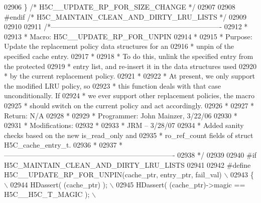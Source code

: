\begin{DoxyCode}
02906 \textcolor{preprocessor}{\} }\textcolor{comment}{/* H5C\_\_UPDATE\_RP\_FOR\_SIZE\_CHANGE */}\textcolor{preprocessor}{}
02907 
02908 \textcolor{preprocessor}{#endif }\textcolor{comment}{/* H5C\_MAINTAIN\_CLEAN\_AND\_DIRTY\_LRU\_LISTS */}\textcolor{preprocessor}{}
02909 
02910 
02911 \textcolor{comment}{/*-------------------------------------------------------------------------}
02912 \textcolor{comment}{ *}
02913 \textcolor{comment}{ * Macro:   H5C\_\_UPDATE\_RP\_FOR\_UNPIN}
02914 \textcolor{comment}{ *}
02915 \textcolor{comment}{ * Purpose:     Update the replacement policy data structures for an}
02916 \textcolor{comment}{ *      unpin of the specified cache entry.}
02917 \textcolor{comment}{ *}
02918 \textcolor{comment}{ *      To do this, unlink the specified entry from the protected}
02919 \textcolor{comment}{ *      entry list, and re-insert it in the data structures used}
02920 \textcolor{comment}{ *      by the current replacement policy.}
02921 \textcolor{comment}{ *}
02922 \textcolor{comment}{ *      At present, we only support the modified LRU policy, so}
02923 \textcolor{comment}{ *      this function deals with that case unconditionally.  If}
02924 \textcolor{comment}{ *      we ever support other replacement policies, the macro}
02925 \textcolor{comment}{ *      should switch on the current policy and act accordingly.}
02926 \textcolor{comment}{ *}
02927 \textcolor{comment}{ * Return:      N/A}
02928 \textcolor{comment}{ *}
02929 \textcolor{comment}{ * Programmer:  John Mainzer, 3/22/06}
02930 \textcolor{comment}{ *}
02931 \textcolor{comment}{ * Modifications:}
02932 \textcolor{comment}{ *}
02933 \textcolor{comment}{ *      JRM -- 3/28/07}
02934 \textcolor{comment}{ *      Added sanity checks based on the new is\_read\_only and}
02935 \textcolor{comment}{ *      ro\_ref\_count fields of struct H5C\_cache\_entry\_t.}
02936 \textcolor{comment}{ *}
02937 \textcolor{comment}{ *-------------------------------------------------------------------------}
02938 \textcolor{comment}{ */}
02939 
02940 \textcolor{preprocessor}{#if H5C\_MAINTAIN\_CLEAN\_AND\_DIRTY\_LRU\_LISTS}
02941 
02942 \textcolor{preprocessor}{#define H5C\_\_UPDATE\_RP\_FOR\_UNPIN(cache\_ptr, entry\_ptr, fail\_val)       \(\backslash\)}
02943 \textcolor{preprocessor}{\{                                                                      \(\backslash\)}
02944 \textcolor{preprocessor}{    HDassert( (cache\_ptr) );                                           \(\backslash\)}
02945 \textcolor{preprocessor}{    HDassert( (cache\_ptr)->magic == H5C\_\_H5C\_T\_MAGIC );                \(\backslash\)}

\end{DoxyCode}
